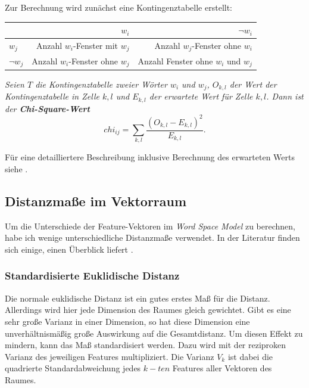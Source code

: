 \documentclass[11pt,numbers=noenddot]{scrartcl}
\begin{document}
Zur Berechnung wird zunächst eine Kontingenztabelle erstellt:
\begin{table}[h]
    \begin{center}
        \begin{tabular}{l|r|r}
                    & $w_i$ & $\neg w_i$ \\ \hline
            $w_j$ &  Anzahl $w_i$-Fenster mit $w_j$ & Anzahl $w_j$-Fenster ohne $w_i$\\ \hline
            $\neg w_j$ &  Anzahl $w_i$-Fenster ohne $w_j$ & Anzahl Fenster ohne $w_i$ und $w_j$
        \end{tabular}
    \end{center}
\end{table}

\emph{Seien $T$ die Kontingenztabelle zweier Wörter $w_i$ und $w_j$, $O_{k,l}$ der Wert der Kontingenztabelle in Zelle $k,l$ und $E_{k,l}$ der erwartete Wert für Zelle $k,l$. Dann ist der \textbf{Chi-Square-Wert}}
\begin{equation*}
   chi_{ij} = \sum_{k,l} { \frac{ (O_{k,l} - E_{k,l})^2} {E_{k,l}}  }.
\end{equation*}

Für eine detailliertere Beschreibung inklusive Berechnung des erwarteten Werts siehe \citet[S. 169ff.]{manning1999}.

\subsection{Distanzmaße im Vektorraum}

Um die Unterschiede der Feature-Vektoren im \emph{Word Space Model} zu berechnen, habe ich wenige unterschiedliche Distanzmaße verwendet. In der Literatur finden sich einige, einen Überblick liefert \citet{cha2007comprehensive}.

\subsubsection{Standardisierte Euklidische Distanz} \label{eucl}

Die normale euklidische Distanz ist ein gutes erstes Maß für die Distanz. Allerdings wird hier jede Dimension des Raumes gleich gewichtet. Gibt es eine sehr große Varianz in einer Dimension, so hat diese Dimension eine unverhältnismäßig große Auswirkung auf die Gesamtdistanz. Um diesen Effekt zu mindern, kann das Maß standardisiert werden. Dazu wird mit der reziproken Varianz des jeweiligen Features multipliziert. Die Varianz $V_k$ ist dabei die quadrierte Standardabweichung jedes $k-ten$ Features aller Vektoren des Raumes.
\end{document}
